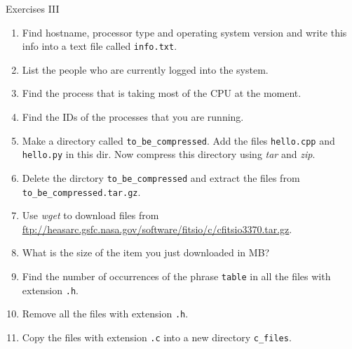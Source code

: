 \documentclass{beamer}
\begin{document}
\begin{frame}{Exercises III}
  \fontsize{8pt}{8}\selectfont
  \begin{enumerate}
    \item Find hostname, processor type and operating system version and write this info into a text file called \texttt{info.txt}.
    \item List the people who are currently logged into the system.
    \item Find the process that is taking most of the CPU at the moment.
    \item Find the IDs of the processes that you are running.
    \item Make a directory called \texttt{to\_be\_compressed}. Add the files \texttt{hello.cpp} and \texttt{hello.py} in this dir.
    Now compress this directory using \textit{tar} and \textit{zip}.
    \item Delete the dirctory \texttt{to\_be\_compressed} and extract the files from \texttt{to\_be\_compressed.tar.gz}.
    \item Use \textit{wget} to download  files from \url{ftp://heasarc.gsfc.nasa.gov/software/fitsio/c/cfitsio3370.tar.gz}.
    \item What is the size of the item you just downloaded in MB?
    \item Find the number of occurrences of the phrase \texttt{table} in all the files with extension \texttt{.h}.
    \item Remove all the files with extension \texttt{.h}.
    \item Copy the files with extension \texttt{.c} into a new directory \texttt{c\_files}.
  \end{enumerate}
\end{frame}
\end{document}
